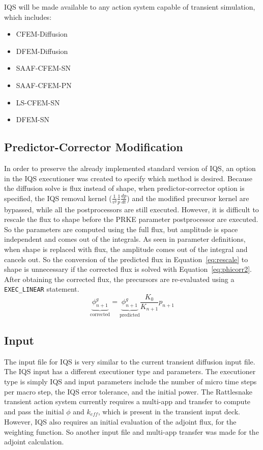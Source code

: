 \documentclass[12pt]{scrartcl}
\newcommand{\rattlesnake}{Rattlesnake }
\newcommand{\eqt}[1]{Equation~\ref{#1}}                     %
\newcommand{\keff}{k_\textit{eff}}
\newcommand{\be}{\begin{equation}}
\newcommand{\ee}{\end{equation}}
\begin{document}
IQS will be made available to any action system capable of transient simulation, which includes:
\begin{itemize}
\item CFEM-Diffusion
\item DFEM-Diffusion
\item SAAF-CFEM-SN
\item SAAF-CFEM-PN
\item LS-CFEM-SN
\item DFEM-SN
\end{itemize}

\subsection{Predictor-Corrector Modification}

In order to preserve the already implemented standard version of IQS, an option in the IQS executioner was created to specify which method is desired.  Because the diffusion solve is flux instead of shape, when predictor-corrector option is specified, the IQS removal kernel ($\frac{1}{v^g}\frac{1}{p}\frac{dp}{dt}$) and the modified precursor kernel are bypassed, while all the postprocessors are still executed.  However, it is difficult to rescale the flux to shape before the PRKE parameter postprocessor are executed.  So the parameters are computed using the full flux, but amplitude is space independent and comes out of the integrals.  As seen in parameter definitions, when shape is replaced with flux, the amplitude comes out of the integral and cancels out.  So the conversion of the predicted flux in  \eqt{eq:rescale} to shape is unnecessary if the corrected flux is solved with \eqt{eq:phicorr2}.  After obtaining the corrected flux, the precursors are re-evaluated using a \texttt{EXEC\_LINEAR} statement.
\be
\underbrace{\phi^g_{n+1}}_{\text{corrected}} = \underbrace{\phi^g_{n+1}}_{\text{predicted}} \frac{K_0}{K_{n+1}} p_{n+1}
\label{eq:phicorr2}
\ee

\subsection{Input}

The input file for IQS is very similar to the current transient diffusion input file.  The IQS input has a different executioner type and parameters.  The executioner type is simply IQS and input parameters include the number of micro time steps per macro step, the IQS error tolerance, and the initial power.  The \rattlesnake transient action system currently requires a multi-app and transfer to compute and pass the initial $\phi$ and $\keff$, which is present in the transient input deck.  However, IQS also requires an initial evaluation of the adjoint flux, for the weighting function.  So another input file and multi-app transfer was made for the adjoint calculation.  \vspace{3mm}
\end{document}
